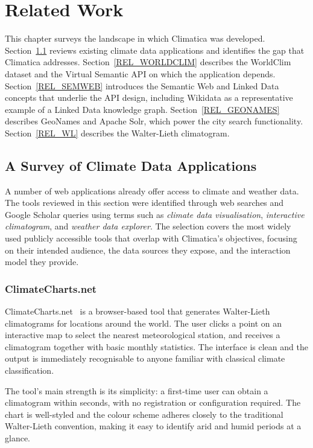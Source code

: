 \chapter{Related Work}\label{REL}

This chapter surveys the landscape in which Climatica was developed.
Section~\ref{REL_APPS} reviews existing climate data applications and identifies
the gap that Climatica addresses. Section~\ref{REL_WORLDCLIM} describes the
WorldClim dataset and the Virtual Semantic API on which the application depends.
Section~\ref{REL_SEMWEB} introduces the Semantic Web and Linked Data concepts
that underlie the API design, including Wikidata as a representative example of
a Linked Data knowledge graph. Section~\ref{REL_GEONAMES} describes GeoNames
and Apache Solr, which power the city search functionality.
Section~\ref{REL_WL} describes the Walter-Lieth climatogram.

\section{A Survey of Climate Data Applications}\label{REL_APPS}

A number of web applications already offer access to climate and weather data.
The tools reviewed in this section were identified through web searches and
Google Scholar queries using terms such as \emph{climate data visualisation},
\emph{interactive climatogram}, and \emph{weather data explorer}. The selection
covers the most widely used publicly accessible tools that overlap with
Climatica's objectives, focusing on their intended audience, the data sources
they expose, and the interaction model they provide.

\subsection{ClimateCharts.net}\label{REL_APPS_CLIMATECHARTS}

ClimateCharts.net~\cite{climatecharts} is a browser-based tool that generates
Walter-Lieth climatograms for locations around the world. The user clicks a
point on an interactive map to select the nearest meteorological station, and
receives a climatogram together with basic monthly statistics. The interface is
clean and the output is immediately recognisable to anyone familiar with
classical climate classification.

The tool's main strength is its simplicity: a first-time user can obtain a
climatogram within seconds, with no registration or configuration required.
The chart is well-styled and the colour scheme adheres closely to the
traditional Walter-Lieth convention, making it easy to identify arid and humid
periods at a glance.

